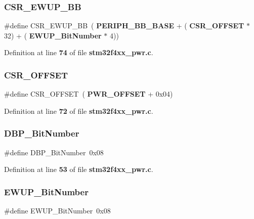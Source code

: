 \subsubsection{C\+S\+R\+\_\+\+E\+W\+U\+P\+\_\+\+BB}
{\footnotesize\ttfamily \#define C\+S\+R\+\_\+\+E\+W\+U\+P\+\_\+\+BB~(\textbf{ P\+E\+R\+I\+P\+H\+\_\+\+B\+B\+\_\+\+B\+A\+SE} + (\textbf{ C\+S\+R\+\_\+\+O\+F\+F\+S\+ET} $\ast$ 32) + (\textbf{ E\+W\+U\+P\+\_\+\+Bit\+Number} $\ast$ 4))}



Definition at line \textbf{ 74} of file \textbf{ stm32f4xx\+\_\+pwr.\+c}.

\mbox{\label{group__PWR_ga984cbe73312b6d3d355c5053763d499a}} 
\subsubsection{C\+S\+R\+\_\+\+O\+F\+F\+S\+ET}
{\footnotesize\ttfamily \#define C\+S\+R\+\_\+\+O\+F\+F\+S\+ET~(\textbf{ P\+W\+R\+\_\+\+O\+F\+F\+S\+ET} + 0x04)}



Definition at line \textbf{ 72} of file \textbf{ stm32f4xx\+\_\+pwr.\+c}.

\mbox{\label{group__PWR_ga36ff45d972bf94f31f172fd53cf44d23}} 
\subsubsection{D\+B\+P\+\_\+\+Bit\+Number}
{\footnotesize\ttfamily \#define D\+B\+P\+\_\+\+Bit\+Number~0x08}



Definition at line \textbf{ 53} of file \textbf{ stm32f4xx\+\_\+pwr.\+c}.

\mbox{\label{group__PWR_ga94fe0520e8f9b71fa2b99c0565ec70ea}} 
\subsubsection{E\+W\+U\+P\+\_\+\+Bit\+Number}
{\footnotesize\ttfamily \#define E\+W\+U\+P\+\_\+\+Bit\+Number~0x08}




